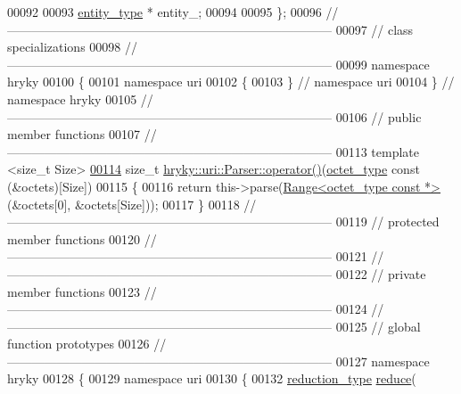 \begin{DoxyCode}
00092 
00093     \hyperlink{classhryky_1_1uri_1_1_entity}{entity_type} * entity\_;
00094 
00095 \};
00096 \textcolor{comment}{//
      ------------------------------------------------------------------------------}
00097 \textcolor{comment}{// class specializations}
00098 \textcolor{comment}{//
      ------------------------------------------------------------------------------}
00099 \textcolor{keyword}{namespace }hryky
00100 \{
00101 \textcolor{keyword}{namespace }uri
00102 \{
00103 \} \textcolor{comment}{// namespace uri}
00104 \} \textcolor{comment}{// namespace hryky}
00105 \textcolor{comment}{//
      ------------------------------------------------------------------------------}
00106 \textcolor{comment}{// public member functions}
00107 \textcolor{comment}{//
      ------------------------------------------------------------------------------}
00113 \textcolor{comment}{}\textcolor{keyword}{template} <\textcolor{keywordtype}{size\_t} Size>
\hypertarget{uri__parser_8h_source_l00114}{}\hyperlink{classhryky_1_1uri_1_1_parser_a24916e6cafbb790e808562600515b4e8}{00114} \textcolor{keywordtype}{size\_t} \hyperlink{classhryky_1_1uri_1_1_parser_a24916e6cafbb790e808562600515b4e8}{hryky::uri::Parser::operator()}(\hyperlink{namespacehryky_a488cba8b666be33ccca70e819684e3c8}{octet_type} \textcolor{keyword}{const} (&octets)[Size])
00115 \{
00116     \textcolor{keywordflow}{return} this->parse(\hyperlink{classhryky_1_1_range}{Range<octet_type const *>}(&octets[0], &octets[Size]));
00117 \}
00118 \textcolor{comment}{//
      ------------------------------------------------------------------------------}
00119 \textcolor{comment}{// protected member functions}
00120 \textcolor{comment}{//
      ------------------------------------------------------------------------------}
00121 \textcolor{comment}{//
      ------------------------------------------------------------------------------}
00122 \textcolor{comment}{// private member functions}
00123 \textcolor{comment}{//
      ------------------------------------------------------------------------------}
00124 \textcolor{comment}{//
      ------------------------------------------------------------------------------}
00125 \textcolor{comment}{// global function prototypes}
00126 \textcolor{comment}{//
      ------------------------------------------------------------------------------}
00127 \textcolor{keyword}{namespace }hryky
00128 \{
00129 \textcolor{keyword}{namespace }uri
00130 \{
00132     \hyperlink{classhryky_1_1_intrusive_ptr}{reduction_type} \hyperlink{namespacehryky_1_1uri_ab4530b241565d82fb0768bb29031858f}{reduce}(

\end{DoxyCode}
